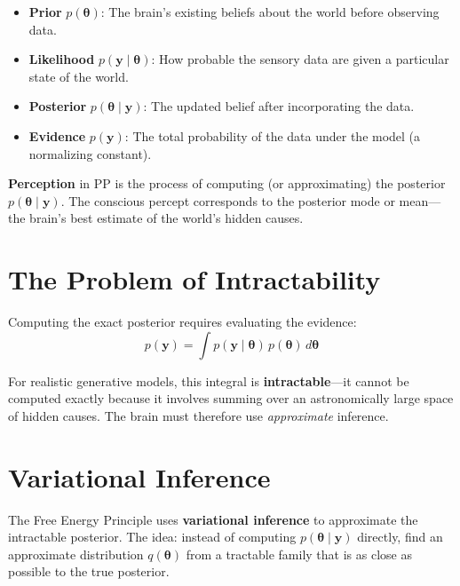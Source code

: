 \documentclass[11pt,a4paper]{report}
\begin{document}
\begin{itemize}[leftmargin=1.5em]
  \item \textbf{Prior} $p(\boldsymbol{\theta})$: The brain's existing beliefs about the world before observing data.
  \item \textbf{Likelihood} $p(\mathbf{y} \mid \boldsymbol{\theta})$: How probable the sensory data are given a particular state of the world.
  \item \textbf{Posterior} $p(\boldsymbol{\theta} \mid \mathbf{y})$: The updated belief after incorporating the data.
  \item \textbf{Evidence} $p(\mathbf{y})$: The total probability of the data under the model (a normalizing constant).
\end{itemize}

\textbf{Perception} in PP is the process of computing (or approximating) the posterior $p(\boldsymbol{\theta} \mid \mathbf{y})$. The conscious percept corresponds to the posterior mode or mean---the brain's best estimate of the world's hidden causes.

\section{The Problem of Intractability}

Computing the exact posterior requires evaluating the evidence:
\[
  p(\mathbf{y}) = \int p(\mathbf{y} \mid \boldsymbol{\theta})\, p(\boldsymbol{\theta})\, d\boldsymbol{\theta}
\]

For realistic generative models, this integral is \textbf{intractable}---it cannot be computed exactly because it involves summing over an astronomically large space of hidden causes. The brain must therefore use \emph{approximate} inference.

\section{Variational Inference}

The Free Energy Principle uses \textbf{variational inference} to approximate the intractable posterior. The idea: instead of computing $p(\boldsymbol{\theta} \mid \mathbf{y})$ directly, find an approximate distribution $q(\boldsymbol{\theta})$ from a tractable family that is as close as possible to the true posterior.
\end{document}
